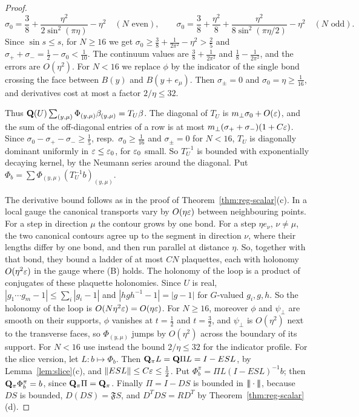 \begin{proof}
\[
\sigma_0=\frac38+\frac{\eta^2}{2\sin^2(\pi\eta)}-\eta^2\quad(N\text{ even}),\qquad\sigma_0=\frac38+\frac{\eta^2}8+\frac{\eta^2}{8\sin^2(\pi\eta/2)}-\eta^2\quad(N\text{ odd}).
\]
Since $\sin s\le s$, for $N\ge16$ we get $\sigma_0\ge\frac38+\frac1{2\pi^2}-\eta^2>\frac25$ and $\sigma_++\sigma_-=\frac12-\sigma_0<\frac1{10}$. The continuum values are $\frac38+\frac1{2\pi^2}$ and $\frac18-\frac1{2\pi^2}$, and the errors are $O(\eta^2)$. For $N<16$ we replace $\phi$ by the indicator of the single bond crossing the face between $B(y)$ and $B(y+e_\mu)$. Then $\sigma_\pm=0$ and $\sigma_0=\eta\ge\frac1{16}$, and derivatives cost at most a factor $2/\eta\le32$.

Thus $\mathbf Q(U)\sum_{(y,\mu)}\Phi_{(y,\mu)}\beta_{(y,\mu)}=T_U\beta$. The diagonal of $T_U$ is $m_\perp\sigma_0+O(\varepsilon)$, and the sum of the off-diagonal entries of a row is at most $m_\perp(\sigma_++\sigma_-)(1+C\varepsilon)$. Since $\sigma_0-\sigma_+-\sigma_-\ge\frac15$, resp.\ $\sigma_0\ge\frac1{16}$ and $\sigma_\pm=0$ for $N<16$, $T_U$ is diagonally dominant uniformly in $\varepsilon\le\varepsilon_0$, for $\varepsilon_0$ small. So $T_U^{-1}$ is bounded with exponentially decaying kernel, by the Neumann series around the diagonal. Put $\Phi_b=\sum\Phi_{(y,\mu)}(T_U^{-1}b)_{(y,\mu)}$.

The derivative bound follows as in the proof of Theorem~\ref{thm:reg-scalar}(c). In a local gauge the canonical transports vary by $O(\eta\varepsilon)$ between neighbouring points. For a step in direction $\mu$ the contour grows by one bond. For a step $\eta e_\nu$, $\nu\ne\mu$, the two canonical contours agree up to the segment in direction $\nu$, where their lengths differ by one bond, and then run parallel at distance $\eta$. So, together with that bond, they bound a ladder of at most $CN$ plaquettes, each with holonomy $O(\eta^2\varepsilon)$ in the gauge where (B) holds. The holonomy of the loop is a product of conjugates of these plaquette holonomies. Since $U$ is real, $|g_1\cdots g_m-1|\le\sum_i|g_i-1|$ and $|hgh^{-1}-1|=|g-1|$ for $G$-valued $g_i,g,h$. So the holonomy of the loop is $O(N\eta^2\varepsilon)=O(\eta\varepsilon)$. For $N\ge16$, moreover $\phi$ and $\psi_\perp$ are smooth on their supports, $\phi$ vanishes at $t=\frac12$ and $t=\frac32$, and $\psi_\perp$ is $O(\eta^2)$ next to the transverse faces, so $\Phi_{(y,\mu)}$ jumps by $O(\eta^2)$ across the boundary of its support. For $N<16$ use instead the bound $2/\eta\le32$ for the indicator profile. For the slice version, let $L:b\mapsto\Phi_b$. Then $\mathbf Q_\pi L=\mathbf Q\Pi L=I-ESL$, by Lemma~\ref{lem:slice}(c), and $\|ESL\|\le C\varepsilon\le\frac12$. Put $\Phi^\pi_b=\Pi L(I-ESL)^{-1}b$; then $\mathbf Q_\pi\Phi^\pi_b=b$, since $\mathbf Q_\pi\Pi=\mathbf Q_\pi$. Finally $\Pi=I-DS$ is bounded in $|\!|\!|\cdot|\!|\!|$, because $DS$ is bounded, $D(DS)=\mathfrak FS$, and $D^TDS=RD^T$ by Theorem~\ref{thm:reg-scalar}(d).
\end{proof}

